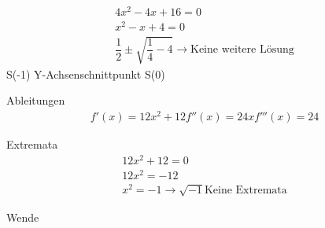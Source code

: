 \documentclass[11pt,a4paper]{article}
\begin{document}
\begin{eqnarray}
4x^2 - 4x + 16 = 0\\
x^2 - x + 4 = 0\\
\dfrac{1}{2} \pm \sqrt{\dfrac{1}{4} - 4} \rightarrow \text{Keine weitere Lösung}
\end{eqnarray}
S(-1) Y-Achsenschnittpunkt S(0)

Ableitungen
\begin{eqnarray}
f'(x) = 12x^2 + 12
f''(x) = 24x
f'''(x) = 24
\end{eqnarray}

Extremata
\begin{eqnarray}
12x^2 + 12 = 0\\
12x^2 = -12\\
x^2 = -1 \rightarrow \sqrt{-1} \text{Keine Extremata}
\end{eqnarray}

Wende
\end{document}
